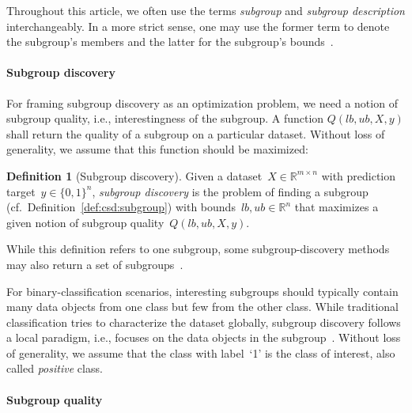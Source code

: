 \documentclass{article}
\theoremstyle{definition}
\newtheorem{definition}{Definition}
\begin{document}
Throughout this article, we often use the terms \emph{subgroup} and \emph{subgroup description} interchangeably.
In a more strict sense, one may use the former term to denote the subgroup's members and the latter for the subgroup's bounds~\cite{atzmueller2015subgroup}.

\paragraph{Subgroup discovery}

For framing subgroup discovery as an optimization problem, we need a notion of subgroup quality, i.e., interestingness of the subgroup.
A function $Q(\mathit{lb}, \mathit{ub}, X, y)$ shall return the quality of a subgroup on a particular dataset.
Without loss of generality, we assume that this function should be maximized:
%
\begin{definition}[Subgroup discovery]
	Given a dataset~$X \in \mathbb{R}^{m \times n}$ with prediction target~$y \in \{0, 1\}^n$,
	\emph{subgroup discovery} is the problem of finding a subgroup (cf.~Definition~\ref{def:csd:subgroup}) with bounds~$\mathit{lb}, \mathit{ub} \in \mathbb{R}^n$ that maximizes a given notion of subgroup quality~$Q(\mathit{lb}, \mathit{ub}, X, y)$.
	\label{def:csd:subgroup-discovery}
\end{definition}
%
While this definition refers to one subgroup, some subgroup-discovery methods may also return a set of subgroups~\cite{atzmueller2015subgroup}.

For binary-classification scenarios, interesting subgroups should typically contain many data objects from one class but few from the other class.
While traditional classification tries to characterize the dataset globally, subgroup discovery follows a local paradigm, i.e., focuses on the data objects in the subgroup~\cite{meeng2021real}.
Without loss of generality, we assume that the class with label~`1' is the class of interest, also called \emph{positive} class.

\paragraph{Subgroup quality}
\end{document}
